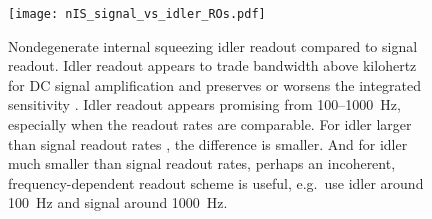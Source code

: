 \begin{figure}
    \centering
    \texttt{[image: nIS\_signal\_vs\_idler\_ROs.pdf]}
    \caption{  Nondegenerate internal squeezing idler readout compared to signal readout. Idler readout appears to trade bandwidth above kilohertz for DC signal amplification and preserves or worsens the integrated sensitivity . Idler readout appears promising from 100--1000~Hz, especially when the readout rates are comparable. For idler larger than signal readout rates , the difference is smaller. And for idler much smaller than signal readout rates, perhaps an incoherent, frequency-dependent readout scheme is useful, e.g.\ use idler around 100~Hz and signal around 1000~Hz. }
    \label{fig:nIS_general_sens_idler}
\end{figure}


